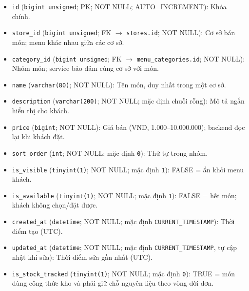 \begin{itemize}

\item \texttt{id} (\texttt{bigint unsigned}; PK; NOT NULL; AUTO_INCREMENT): Khóa chính.

\item \texttt{store\_id} (\texttt{bigint unsigned}; FK $\rightarrow$ \texttt{stores.id}; NOT NULL): Cơ sở bán món; menu khác nhau giữa các cơ sở.

\item \texttt{category\_id} (\texttt{bigint unsigned}; FK $\rightarrow$ \texttt{menu\_categories.id}; NOT NULL): Nhóm món; service bảo đảm cùng cơ sở với món.

\item \texttt{name} (\texttt{varchar(80)}; NOT NULL): Tên món, duy nhất trong một cơ sở.

\item \texttt{description} (\texttt{varchar(200)}; NOT NULL; mặc định chuỗi rỗng): Mô tả ngắn hiển thị cho khách.

\item \texttt{price} (\texttt{bigint}; NOT NULL): Giá bán (VND, 1.000–10.000.000); backend đọc lại khi khách đặt.

\item \texttt{sort\_order} (\texttt{int}; NOT NULL; mặc định \texttt{0}): Thứ tự trong nhóm.

\item \texttt{is\_visible} (\texttt{tinyint(1)}; NOT NULL; mặc định \texttt{1}): FALSE = ẩn khỏi menu khách.

\item \texttt{is\_available} (\texttt{tinyint(1)}; NOT NULL; mặc định \texttt{1}): FALSE = hết món; khách không chọn/đặt được.

\item \texttt{created\_at} (\texttt{datetime}; NOT NULL; mặc định \texttt{CURRENT\_TIMESTAMP}): Thời điểm tạo (UTC).

\item \texttt{updated\_at} (\texttt{datetime}; NOT NULL; mặc định \texttt{CURRENT\_TIMESTAMP}, tự cập nhật khi sửa): Thời điểm sửa gần nhất (UTC).

\item \texttt{is\_stock\_tracked} (\texttt{tinyint(1)}; NOT NULL; mặc định \texttt{0}): TRUE = món dùng công thức kho và phải giữ chỗ nguyên liệu theo vòng đời đơn.

\end{itemize}

